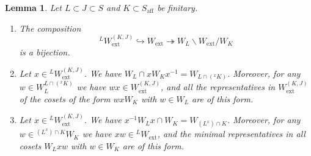 \documentclass[11pt]{amsart}
\numberwithin{equation}{section}
\theoremstyle{plain}
\newtheorem{lem}[thm]{Lemma}
\theoremstyle{definition}
\newcommand{\ex}{\mathrm{ext}}
\newcommand{\af}{\mathrm{aff}}
\begin{document}
\begin{lem}
\label{lem:bi-min}
Let $L \subset J\subset S$ and $K\subset S_\af$ be finitary. 
\begin{enumerate}
\item 
\label{it:bi-min-1}
The composition
\[
{}^{L} W_\ex^{(K,J)} \hookrightarrow W_\ex \twoheadrightarrow W_{L}\backslash W_\ex /W_K
\]
is a bijection. 
\item 
\label{it:bi-min-2}
Let $x\in {}^{L}W_\ex^{(K,J)}$. 
We have $W_{L}\cap xW_Kx^{-1} = W_{L \cap ({}^xK)}$. Moreover, for any $w \in W_{L}^{L\cap ({}^xK)}$ we have $wx\in W_\ex^{(K,J)}$, and all the representatives in $W_\ex^{(K,J)}$ of the cosets of the form $wxW_K$ with $w \in W_L$ are of this form.
\item 
\label{it:bi-min-3}
Let $x\in {}^{L} W_\ex^{(K,J)}$. 
We have $x^{-1}W_{L} x\cap W_K = W_{(L^x)\cap K}$. Moreover, for any $w \in {}^{(L^x)\cap K}W_K$ we have $xw\in {}^{L}W_\ex$, and the minimal representatives in all cosets $W_L xw$ with $w \in W_K$ are of this form.
\end{enumerate}
\end{lem}
\end{document}
